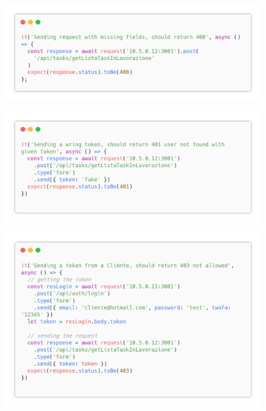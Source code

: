 \documentclass{report}
\begin{document}
\begin{figure}[H]
	\centering\includegraphics[width=1\textwidth]{images/code_in_lavorazione_test1.png}
\end{figure}
\begin{figure}[H]
	\centering\includegraphics[width=1\textwidth]{images/code_in_lavorazione_test2.png}
\end{figure}
\begin{figure}[H]
	\centering\includegraphics[width=1\textwidth]{images/code_in_lavorazione_test3.png}
\end{figure}
\end{document}
